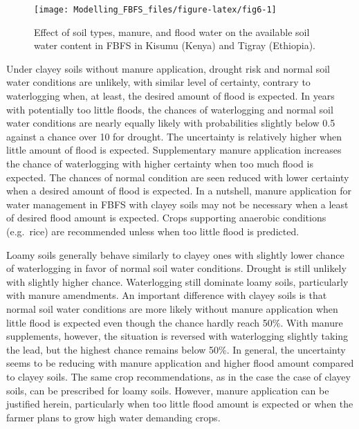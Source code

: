 \documentclass[12pt,oneside]{article}
\begin{document}
\begin{figure}[!htbp]

{\centering \texttt{[image: Modelling\_FBFS\_files/figure-latex/fig6-1]} 

}

\caption{Effect of soil types, manure, and flood water on the available soil water content in FBFS in Kisumu (Kenya) and Tigray (Ethiopia).}\label{fig:fig6}
\end{figure}

Under clayey soils without manure application, drought risk and normal soil water conditions are unlikely, with similar level of certainty, contrary to waterlogging when, at least, the desired amount of flood is expected. In years with potentially too little floods, the chances of waterlogging and normal soil water conditions are nearly equally likely with probabilities slightly below 0.5 against a chance over 10 for drought. The uncertainty is relatively higher when little amount of flood is expected. Supplementary manure application increases the chance of waterlogging with higher certainty when too much flood is expected. The chances of normal condition are seen reduced with lower certainty when a desired amount of flood is expected. In a nutshell, manure application for water management in FBFS with clayey soils may not be necessary when a least of desired flood amount is expected. Crops supporting anaerobic conditions (e.g.~rice) are recommended unless when too little flood is predicted.

Loamy soils generally behave similarly to clayey ones with slightly lower chance of waterlogging in favor of normal soil water conditions. Drought is still unlikely with slightly higher chance. Waterlogging still dominate loamy soils, particularly with manure amendments. An important difference with clayey soils is that normal soil water conditions are more likely without manure application when little flood is expected even though the chance hardly reach 50\%. With manure supplements, however, the situation is reversed with waterlogging slightly taking the lead, but the highest chance remains below 50\%. In general, the uncertainty seems to be reducing with manure application and higher flood amount compared to clayey soils. The same crop recommendations, as in the case the case of clayey soils, can be prescribed for loamy soils. However, manure application can be justified herein, particularly when too little flood amount is expected or when the farmer plans to grow high water demanding crops.
\end{document}

